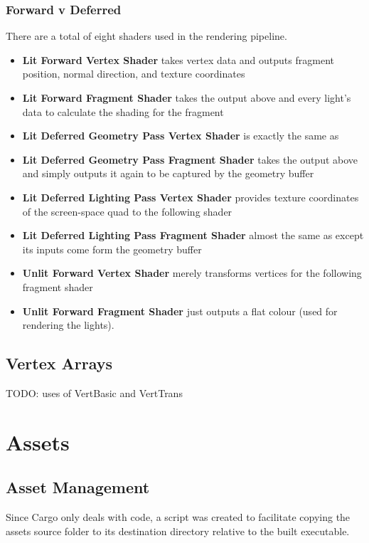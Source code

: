 \subsubsection{Forward v Deferred}
There are a total of eight shaders used in the rendering pipeline.
\begin{itemize}
  \item {} \textbf{Lit Forward Vertex Shader} takes vertex data and outputs fragment position, normal direction, and texture coordinates
  \item {} \textbf{Lit Forward Fragment Shader} takes the output above and every light's data to calculate the shading for the fragment
  \item {} \textbf{Lit Deferred Geometry Pass Vertex Shader} is exactly the same as 
  \item {} \textbf{Lit Deferred Geometry Pass Fragment Shader} takes the output above and simply outputs it again to be captured by the geometry buffer
  \item {} \textbf{Lit Deferred Lighting Pass Vertex Shader} provides texture coordinates of the screen-space quad to the following shader
  \item {} \textbf{Lit Deferred Lighting Pass Fragment Shader} almost the same as  except its inputs come form the geometry buffer
  \item {} \textbf{Unlit Forward Vertex Shader} merely transforms vertices for the following fragment shader
  \item {} \textbf{Unlit Forward Fragment Shader} just outputs a flat colour (used for rendering the lights).
\end{itemize}

\subsection{Vertex Arrays}
TODO: uses of VertBasic and VertTrans

\section{Assets}

\subsection{Asset Management}
Since Cargo only deals with code, a  script was created to facilitate copying the assets source folder to its destination directory relative to the built executable.

